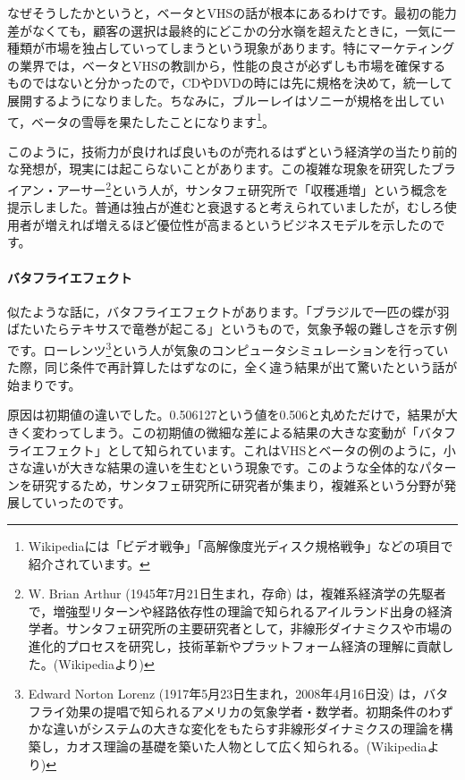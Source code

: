 \documentclass{ltjsbook}
\begin{document}
なぜそうしたかというと，ベータとVHSの話が根本にあるわけです。最初の能力差がなくても，顧客の選択は最終的にどこかの分水嶺を超えたときに，一気に一種類が市場を独占していってしまうという現象があります。特にマーケティングの業界では，ベータとVHSの教訓から，性能の良さが必ずしも市場を確保するものではないと分かったので，CDやDVDの時には先に規格を決めて，統一して展開するようになりました。ちなみに，ブルーレイはソニーが規格を出していて，ベータの雪辱を果たしたことになります\footnote{Wikipediaには「ビデオ戦争」「高解像度光ディスク規格戦争」などの項目で紹介されています。}。

このように，技術力が良ければ良いものが売れるはずという経済学の当たり前的な発想が，現実には起こらないことがあります。この複雑な現象を研究したブライアン・アーサー\footnote{W. Brian Arthur (1945年7月21日生まれ，存命) は，複雑系経済学の先駆者で，増強型リターンや経路依存性の理論で知られるアイルランド出身の経済学者。サンタフェ研究所の主要研究者として，非線形ダイナミクスや市場の進化的プロセスを研究し，技術革新やプラットフォーム経済の理解に貢献した。(Wikipediaより)}という人が，サンタフェ研究所で「収穫逓増」という概念を提示しました。普通は独占が進むと衰退すると考えられていましたが，むしろ使用者が増えれば増えるほど優位性が高まるというビジネスモデルを示したのです。

\paragraph{バタフライエフェクト}

似たような話に，バタフライエフェクトがあります。「ブラジルで一匹の蝶が羽ばたいたらテキサスで竜巻が起こる」というもので，気象予報の難しさを示す例です。ローレンツ\footnote{Edward Norton Lorenz (1917年5月23日生まれ，2008年4月16日没) は，バタフライ効果の提唱で知られるアメリカの気象学者・数学者。初期条件のわずかな違いがシステムの大きな変化をもたらす非線形ダイナミクスの理論を構築し，カオス理論の基礎を築いた人物として広く知られる。(Wikipediaより)}という人が気象のコンピュータシミュレーションを行っていた際，同じ条件で再計算したはずなのに，全く違う結果が出て驚いたという話が始まりです。

原因は初期値の違いでした。0.506127という値を0.506と丸めただけで，結果が大きく変わってしまう。この初期値の微細な差による結果の大きな変動が「バタフライエフェクト」として知られています。これはVHSとベータの例のように，小さな違いが大きな結果の違いを生むという現象です。このような全体的なパターンを研究するため，サンタフェ研究所に研究者が集まり，複雑系という分野が発展していったのです。
\end{document}
